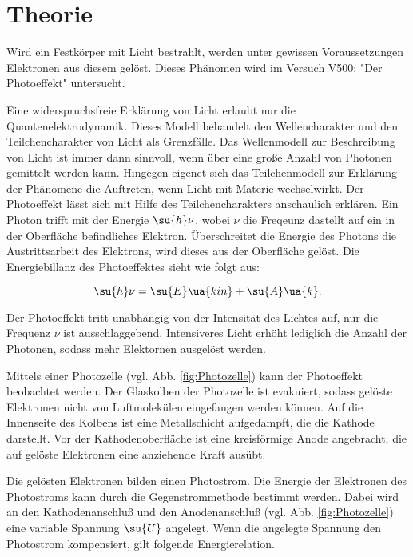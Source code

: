 \section{Theorie}

Wird ein Festkörper mit Licht bestrahlt, werden unter gewissen Voraussetzungen
Elektronen aus diesem gelöst. Dieses Phänomen wird im Versuch V500: "Der Photoeffekt"
untersucht.

Eine widerspruchsfreie Erklärung von Licht erlaubt nur die Quantenelektrodynamik.
Dieses Modell behandelt den Wellencharakter und den Teilchencharakter von Licht
als Grenzfälle. Das Wellenmodell zur Beschreibung von Licht ist immer dann sinnvoll,
wenn über eine große Anzahl von Photonen gemittelt werden kann. Hingegen eigenet
sich das Teilchenmodell zur Erklärung der Phänomene die Auftreten, wenn Licht
mit Materie wechselwirkt.
Der Photoeffekt lässt sich mit Hilfe des Teilchencharakters anschaulich erklären.
Ein Photon trifft mit der Energie $\su{h}\nu$, wobei $\nu$ die Freqeunz dastellt
auf ein in der Oberfläche befindliches Elektron.
Überschreitet die Energie des Photons die Austrittsarbeit des Elektrons, wird
dieses aus der Oberfläche gelöst. Die Energiebillanz des Photoeffektes
sieht wie folgt aus:

\begin{equation}
  \label{eqn:Energiebillanz}
  \su{h}\nu = \su{E}\ua{kin} + \su{A}\ua{k}.
\end{equation}

Der Photoeffekt tritt unabhängig von der Intensität des Lichtes auf, nur die
Frequenz $\nu$ ist ausschlaggebend. Intensiveres Licht erhöht lediglich die
Anzahl der Photonen, sodass mehr Elektornen ausgelöst werden.

Mittels einer Photozelle (vgl. Abb. \ref{fig:Photozelle}) kann der Photoeffekt beobachtet werden.
Der Glaskolben der Photozelle ist evakuiert, sodass gelöste Elektronen nicht von
Luftmolekülen eingefangen werden können. Auf die Innenseite des Kolbens ist eine
Metallschicht aufgedampft, die die Kathode darstellt. Vor der Kathodenoberfläche
ist eine kreisförmige Anode angebracht, die auf gelöste Elektronen eine anziehende
Kraft ausübt.

Die gelösten Elektronen bilden einen Photostrom. Die Energie der Elektronen des
Photostroms kann durch die Gegenstrommethode bestimmt werden.
Dabei wird an den Kathodenanschluß und den Anodenanschluß (vgl. Abb. \ref{fig:Photozelle})
eine variable Spannung $\su{U}$ angelegt.
Wenn die angelegte Spannung den Photostrom kompensiert, gilt folgende Energierelation.

